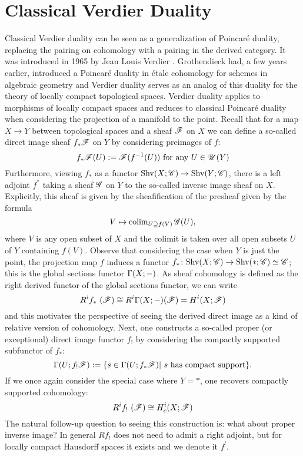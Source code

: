 \documentclass[../../thesis.tex]{subfiles}
\begin{document}
\section{Classical Verdier Duality}
Classical Verdier duality can be seen as a generalization of Poincaré duality, replacing the pairing on cohomology with a pairing in the derived category.
It was introduced in 1965 by Jean Louis Verdier \cite{Verdier95}.
Grothendieck had, a few years earlier, introduced a Poincaré duality in étale cohomology for schemes in algebraic geometry and Verdier duality serves as an analog of this duality for the theory of locally compact topological spaces.
Verdier duality applies to morphisms of locally compact spaces and reduces to classical Poincaré duality when considering the projection of a manifold to the point.
Recall that for a map $X \to Y$ between topological spaces and a sheaf $\mathscr{F}$ on $X$ we can define a so-called direct image sheaf $f_*\mathscr{F}$ on $Y$ by considering preimages of $f$:
\[
    f_*\mathscr{F}(U) : = \mathscr{F}(f^{-1}(U)) \text{ for any }  U \in \mathscr{U}(Y)
\]
Furthermore, viewing $f_*$ as a functor $\mathrm{Shv}(X;\mathscr{C}) \to \mathrm{Shv}(Y; \mathscr{C})$, there is a left adjoint $f^*$ taking a sheaf $\mathscr{G}$ on $Y$ to the so-called inverse image sheaf on $X$.
Explicitly, this sheaf is given by the sheafification of the presheaf given by the formula
\[
    V \mapsto \operatorname{colim}_{U \supseteq f(V)}\mathscr{G}(U),
\]
where $V$ is any open subset of $X$ and the colimit is taken over all open subsets $U$ of $Y$ containing $f(V)$.
Observe that considering the case when $Y$ is just the point, the projection map $f$ induces a functor $f_* \colon \mathrm{Shv}(X;\mathscr{C}) \to \mathrm{Shv}(*; \mathscr{C}) \simeq \mathscr{C}$; this is the global sections functor $\Gamma(X; {-})$.
As sheaf cohomology is defined as the right derived functor of the global sections functor, we can write
\[
    R^i f_* (\F) \cong R^i\Gamma(X;\blank)(\F) = H^i(X; \F)
\]
and this motivates the perspective of seeing the derived direct image as a kind of relative version of cohomology.
Next, one constructs a so-called proper (or exceptional) direct image functor $f_!$ by considering the compactly supported subfunctor of $f_*$:
\[
    \Gamma(U; f_!\F) : = \{ s \in \Gamma(U; f_*\F) | s \text{ has compact support}\}.
\]
If we once again consider the special case where $Y = *$, one recovers compactly supported cohomology:
\[
    R^i f_! (\F) \cong H_c^i(X; \F)
\]
The natural follow-up question to seeing this construction is: what about proper inverse image?
In general $Rf_!$ does not need to admit a right adjoint, but for locally compact Hausdorff spaces it exists and we denote it $f^!$.
\end{document}
